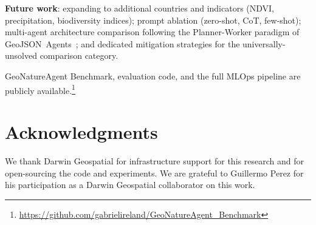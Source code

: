 \documentclass[10pt,twocolumn]{article}
\begin{document}
\noindent\textbf{Future work}: expanding to additional countries and indicators (NDVI, precipitation, biodiversity indices); prompt ablation (zero-shot, CoT, few-shot); multi-agent architecture comparison following the Planner-Worker paradigm of GeoJSON~Agents~\citep{luo2025geojsonagents}; and dedicated mitigation strategies for the universally-unsolved comparison category.

GeoNatureAgent Benchmark, evaluation code, and the full MLOps pipeline are publicly available.\footnote{\url{https://github.com/gabrielireland/GeoNatureAgent_Benchmark}}


\section*{Acknowledgments}

We thank Darwin Geospatial for infrastructure support for this research and for open-sourcing the code and experiments. We are grateful to Guillermo Perez for his participation as a Darwin Geospatial collaborator on this work.



\end{document}
